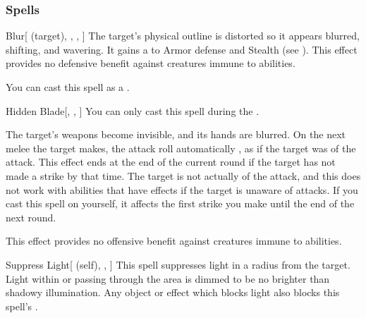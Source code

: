 \subsubsection{Spells}


\lowercase{\hypertarget{spell:Blur}{}}\label{spell:Blur}
\begin{attuneability}[Rank 1]{\hypertarget{spell:Blur}{Blur}}[ (target), , , ]
The target's physical outline is distorted so it appears blurred, shifting, and wavering.
It gains a   to Armor defense and Stealth (see ).
This effect provides no defensive benefit against creatures immune to  abilities.

You can cast this spell as a .
\end{attuneability}
\vspace{0.25em}



\lowercase{\hypertarget{spell:Hidden Blade}{}}\label{spell:Hidden Blade}
\begin{freeability}[Rank 1]{\hypertarget{spell:Hidden Blade}{Hidden Blade}}[, , ]
You can only cast this spell during the .

The target's weapons become invisible, and its hands are blurred.
On the next melee  the target makes,
the attack roll automatically ,
as if the target was  of the attack.
This effect ends at the end of the current round if the target has not made a strike by that time.
The target is not actually  of the attack, and this does not work with abilities that have effects if the target is unaware of attacks.
If you cast this spell on yourself, it affects the first strike you make until the end of the next round.

This effect provides no offensive benefit against creatures immune to  abilities.
\end{freeability}
\vspace{0.25em}



\lowercase{\hypertarget{spell:Suppress Light}{}}\label{spell:Suppress Light}
\begin{attuneability}[Rank 1]{\hypertarget{spell:Suppress Light}{Suppress Light}}[ (self), , ]
This spell suppresses light in a \areamed radius  from the target.
Light within or passing through the area is dimmed to be no brighter than shadowy illumination.
Any object or effect which blocks light also blocks this spell's .
\end{attuneability}
\vspace{0.25em}



